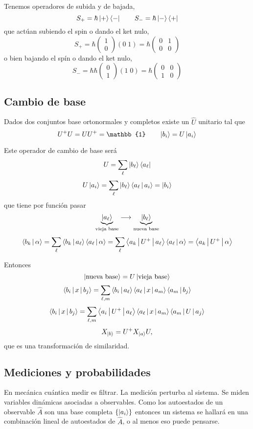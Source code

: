 \documentclass[10pt,oneside]{CBFT_book}
\begin{document}
Tenemos operadores de subida y de bajada,
\[
	S_+ = \hbar \Ket{+}\Bra{-} \qquad S_- = \hbar \Ket{-}\Bra{+}
\]
que actúan subiendo el spin o dando el ket nulo,
\[
	S_+ = \hbar \begin{pmatrix} 1 \\ 0 \end{pmatrix} ( 0 \; 1 ) 
		= \hbar \begin{pmatrix}  0 & 1 \\ 0 & 0 \end{pmatrix}
\]
o bien bajando el spín o dando el ket nulo,
\[
	S_- =\hbar \hbar \begin{pmatrix} 0 \\ 1 \end{pmatrix} ( 1 \; 0 ) 
	 = \hbar \begin{pmatrix} 0 & 0 \\ 1 & 0 \end{pmatrix}
\]

\subsection{Cambio de base}

Dados dos conjuntos base ortonormales y completos existe un $\widehat{U}$ unitario tal que 
\[
	U^+U=UU^+=\mathbb{1} \qquad \Ket{b_i}=U\Ket{a_i}
\]

Este operador de cambio de base será 
\[
	U = \sum_\ell \Ket{b_\ell}\Bra{a_\ell}
\]
\[
	U\Ket{a_i} = \sum_\ell \Ket{b_\ell}\Braket{a_\ell|a_i} = \Ket{b_i}
\]
que tiene por función pasar 
\[
	\underbrace{\Ket{a_\ell}}_{\text{vieja base}} \longrightarrow \underbrace{\Ket{b_\ell}}_{\text{nueva base}}
\]
\[
	\Braket{b_k|\alpha} = \sum_\ell \Braket{b_k|a_\ell}  \Braket{a_\ell|\alpha}  =
	\sum_\ell \Braket{a_k|U^+|a_\ell}  \Braket{a_\ell|\alpha} = \Braket{a_k|U^+|\alpha} 
\]

Entonces
\[
	\Ket{\text{nueva base}} = U \Ket{\text{vieja base}}
\]
\[
	\Braket{b_i | x | b_j} = \sum_{\ell,m} \Braket{b_i|a_\ell}\Braket{a_\ell|x|a_m}\Braket{a_m|b_j }
\]
\[
	\Braket{b_i | x | b_j} = \sum_{\ell,m}\Braket{a_i|U^+|a_\ell}\Braket{a_\ell|x|a_m}\Braket{a_m|U|a_j}
\]
\[
	X_{\Ket{b}} = U^+ X_{\Ket{a}} U,
\]
que es una transformación de similaridad.

\subsection{Mediciones y probabilidades}

En mecánica cuántica medir es filtrar. La medición perturba al sistema. Se miden variables dinámicas asociadas a 
observables.
Como los autoestados de un observable $\hat{A}$ son una base completa $\{\Ket{a_i}\}$ entonces un sistema se hallará en 
una combinación lineal de autoestados de $\hat{A}$, o al menos eso puede pensarse.
\end{document}
